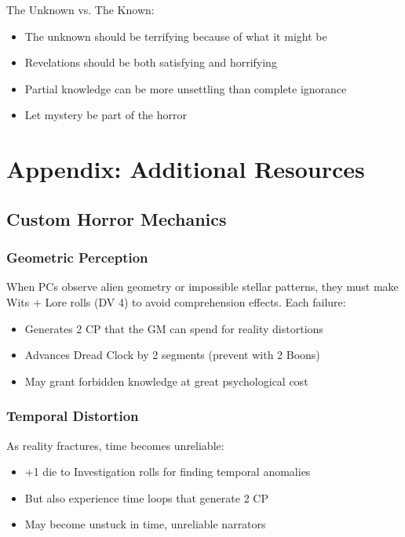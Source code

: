 \documentclass[11pt]{article}
\begin{document}
The Unknown vs. The Known:
\begin{itemize}
\item The unknown should be terrifying because of what it might be
\item Revelations should be both satisfying and horrifying
\item Partial knowledge can be more unsettling than complete ignorance
\item Let mystery be part of the horror
\end{itemize}

\section{Appendix: Additional Resources}

\subsection{Custom Horror Mechanics}

\subsubsection{Geometric Perception}

When PCs observe alien geometry or impossible stellar patterns, they must make Wits + Lore rolls (DV 4) to avoid comprehension effects. Each failure:
\begin{itemize}
\item Generates 2 CP that the GM can spend for reality distortions
\item Advances Dread Clock by 2 segments (prevent with 2 Boons)
\item May grant forbidden knowledge at great psychological cost
\end{itemize}

\subsubsection{Temporal Distortion}

As reality fractures, time becomes unreliable:
\begin{itemize}
\item +1 die to Investigation rolls for finding temporal anomalies
\item But also experience time loops that generate 2 CP
\item May become unstuck in time, unreliable narrators
\end{itemize}
\end{document}
